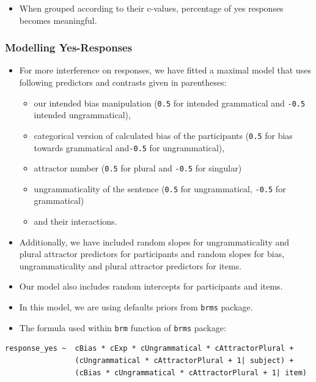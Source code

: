 \documentclass[
  10pt,
  english,
  doc,floatsintext]{apa6}
\providecommand{\tightlist}{%
  \setlength{\itemsep}{0pt}\setlength{\parskip}{0pt}}
\begin{document}
\begin{itemize}
\tightlist
\item
  When grouped according to their c-values, percentage of yes responses becomes meaningful.
\end{itemize}

\hypertarget{modelling-yes-responses}{%
\subsubsection{Modelling Yes-Responses}\label{modelling-yes-responses}}

\begin{itemize}
\item
  For more interference on responses, we have fitted a maximal model that uses following predictors and contrasts given in parentheses:

  \begin{itemize}
  \tightlist
  \item
    our intended bias manipulation (\texttt{0.5} for intended grammatical and \texttt{-0.5} intended ungrammatical),
  \item
    categorical version of calculated bias of the participants (\texttt{0.5} for bias towards grammatical and\texttt{-0.5} for ungrammatical),
  \item
    attractor number (\texttt{0.5} for plural and \texttt{-0.5} for singular)
  \item
    ungrammaticality of the sentence (\texttt{0.5} for ungrammatical, \texttt{-0.5} for grammatical)
  \item
    and their interactions.
  \end{itemize}
\item
  Additionally, we have included random slopes for ungrammaticality and plural attractor predictors for participants and random slopes for bias, ungrammaticality and plural attractor predictors for items.
\item
  Our model also includes random intercepts for participants and items.
\item
  In this model, we are using defaults priors from \texttt{brms} package.
\item
  The formula used within \texttt{brm} function of \texttt{brms} package:
\end{itemize}

\begin{verbatim}
response_yes ~  cBias * cExp * cUngrammatical * cAttractorPlural +
                (cUngrammatical * cAttractorPlural + 1| subject) +
                (cBias * cUngrammatical * cAttractorPlural + 1| item)
\end{verbatim}
\end{document}
